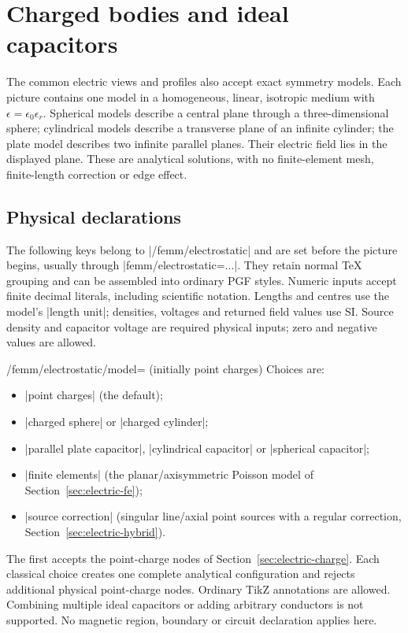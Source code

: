 \section{Charged bodies and ideal capacitors}
\label{sec:electric-classics}

The common electric views and profiles also accept exact symmetry models.
Each picture contains one model in a homogeneous, linear, isotropic medium
with $\epsilon=\epsilon_0\epsilon_r$. Spherical models describe a central plane
through a three-dimensional sphere; cylindrical models describe a transverse
plane of an infinite cylinder; the plate model describes two infinite parallel
planes. Their electric field lies in the displayed plane. These are analytical
solutions, with no finite-element mesh, finite-length correction or edge effect.

\subsection{Physical declarations}
\label{sec:electric-classic-model}
The following keys belong to |/femm/electrostatic| and are set before the
picture begins, usually through |femm/electrostatic={...}|. They retain normal
TeX grouping and can be assembled into ordinary PGF styles. Numeric inputs
accept finite decimal literals, including scientific notation. Lengths and
centres use the model's |length unit|; densities, voltages and returned field
values use SI. Source density and capacitor voltage are required physical
inputs; zero and negative values are allowed.

\begin{key}{/femm/electrostatic/model= (initially point charges)}
Choices are:
\begin{itemize}
\item |point charges| (the default);
\item |charged sphere| or |charged cylinder|;
\item |parallel plate capacitor|, |cylindrical capacitor| or |spherical capacitor|;
\item |finite elements| (the planar/axisymmetric Poisson model of
      Section~\ref{sec:electric-fe});
\item |source correction| (singular line/axial point sources with a regular
      correction, Section~\ref{sec:electric-hybrid}).
\end{itemize}
The first accepts the point-charge nodes of Section~\ref{sec:electric-charge}.
Each classical choice creates one complete analytical configuration and rejects
additional physical point-charge nodes. Ordinary TikZ annotations are allowed.
Combining multiple ideal capacitors or adding arbitrary conductors is not
supported. No magnetic region, boundary or circuit declaration applies here.
\end{key}

